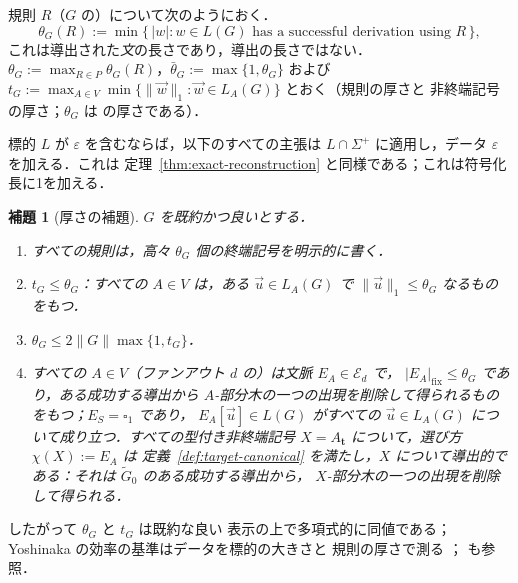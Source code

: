 \documentclass[11pt,a4paper]{ltjsarticle}
\numberwithin{equation}{section}
\theoremstyle{plain}
\newtheorem{lemma}[theorem]{補題}
\theoremstyle{definition}
\theoremstyle{remark}
\newcommand{\tuple}[1]{\vec{#1}}
\newcommand{\blank}{\square}
\newcommand{\eps}{\varepsilon}
\theoremstyle{plain}
\begin{document}
規則 $R$（$G$ の）について次のようにおく．
\[
 \theta_G(R):=\min\{\,|w|:w\in L(G)\text{ has a successful derivation using }R\,\},
\]
これは導出された\emph{文}の長さであり，導出の長さではない．
$\theta_G:=\max_{R\in P}\theta_G(R)$，$\bar\theta_G:=\max\{1,\theta_G\}$ および
$t_G:=\max_{A\in V}\min\{\|\tuple w\|_1:\tuple w\in L_A(G)\}$ とおく（規則の厚さと
非終端記号の厚さ；$\theta_G$ は
\cite[Section~4.3]{Yoshinaka2011} の厚さである）．


標的 $L$ が $\eps$ を含むならば，以下のすべての主張は
$L\cap\Sigma^+$ に適用し，データ $\eps$ を加える．これは
定理~\ref{thm:exact-reconstruction} と同様である；これは符号化長に1を加える．

\begin{lemma}[厚さの補題]
\label{lem:thickness-equivalence}
\label{lem:thickness-local-bounds}
\label{lem:untyped-contexts}
$G$ を既約かつ良いとする．
\begin{enumerate}[label=\textup{(\roman*)},leftmargin=*]
\item すべての規則は，高々 $\theta_G$ 個の終端記号を明示的に書く．
\item $t_G\le\theta_G$：すべての $A\in V$ は，ある $\tuple u\in L_A(G)$ で
$\|\tuple u\|_1\le\theta_G$ なるものをもつ．
\item $\theta_G\le 2\|G\|\max\{1,t_G\}$．
\item すべての $A\in V$（ファンアウト $d$ の）は文脈 $E_A\in\mathcal E_d$ で，
$|E_A|_{\mathrm{fix}}\le\theta_G$ であり，ある成功する導出から
$A$-部分木の一つの出現を削除して得られるものをもつ；$E_S=\blank_1$ であり，
$E_A[\tuple u]\in L(G)$ がすべての $\tuple u\in L_A(G)$ について成り立つ．すべての型付き非終端記号
$X=A_{\mathbf t}$ について，選び方 $\chi(X):=E_A$ は
定義~\ref{def:target-canonical} を満たし，$X$ について\emph{導出的}である：それは
$\widetilde G_0$ のある成功する導出から，
$X$-部分木の一つの出現を削除して得られる．
\end{enumerate}
\end{lemma}


したがって $\theta_G$ と $t_G$ は既約な良い
表示の上で多項式的に同値である；Yoshinaka の効率の基準はデータを標的の大きさと
規則の厚さで測る \cite[Definition~1]{Yoshinaka2011}；
\cite{EyraudHeinzYoshinaka2016} も参照．
\end{document}

